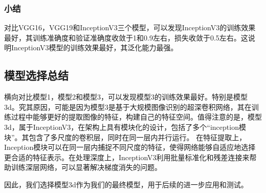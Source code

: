 \subsubsection{小结}

对比VGG16，VGG19和InceptionV3三个模型，可以发现InceptionV3的训练效果最好，其训练准确度和验证准确度收敛于1和0.9左右，损失收敛于0.5左右。这说明InceptionV3模型的训练效果最好，其泛化能力最强。

\subsection{模型选择总结}
横向对比模型1，模型2和模型3，可以发现模型3的训练效果最好。特别是模型3d。究其原因，可能是因为模型3是基于大规模图像识别的超深卷积网络，其在训练过程中能够更好的提取图像的特征，构建自己的特征空间。值得注意的是，模型3d，属于InceptionV3，在架构上具有模块化的设计，包括了多个“inception模块”。其包含了多尺度的卷积层，同时在同一层内并行运行。
在特征提取上，Inception模块可以在同一层内捕捉不同尺度的特征，使得网络能够自适应地选择更合适的特征表示。在处理深度上，InceptionV3利用批量标准化和残差连接来帮助训练深层网络，可以显著解决梯度消失的问题。

因此，我们选择模型3d作为我们的最终模型，用于后续的进一步应用和测试。

